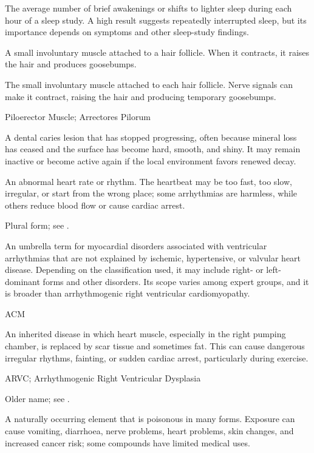  The average number of brief awakenings or shifts to lighter sleep during each hour of a sleep study. A high result suggests repeatedly interrupted sleep, but its importance depends on symptoms and other sleep-study findings.

 A small involuntary muscle attached to a hair follicle. When it contracts, it raises the hair and produces goosebumps.

 The small involuntary muscle attached to each hair follicle. Nerve signals can make it contract, raising the hair and producing temporary goosebumps.

\synonyms
Piloerector Muscle; Arrectores Pilorum

 A dental caries lesion that has stopped progressing, often
because mineral loss has ceased and the surface has become hard, smooth, and shiny. It may
remain inactive or become active again if the local environment favors renewed decay.

 An abnormal heart rate or rhythm. The heartbeat may be too fast, too slow, irregular, or start from the wrong place; some arrhythmias are harmless, while others reduce blood flow or cause cardiac arrest.

 Plural form; see .

 An umbrella term for myocardial disorders associated with ventricular arrhythmias that are not explained by ischemic,
hypertensive, or valvular heart disease. Depending on the classification used, it may include right- or left-dominant forms and other
disorders. Its scope varies among expert groups, and it is broader than arrhythmogenic right ventricular cardiomyopathy.

\synonyms
ACM

 An inherited disease in which heart muscle, especially in the right pumping chamber, is replaced by scar tissue and sometimes fat. This can cause dangerous irregular rhythms, fainting, or sudden cardiac arrest, particularly during exercise.

\synonyms
ARVC; Arrhythmogenic Right Ventricular Dysplasia

 Older name; see .

 A naturally occurring element that is poisonous in many forms. Exposure can cause vomiting, diarrhoea, nerve problems, heart problems, skin changes, and increased cancer risk; some compounds have limited medical uses.

